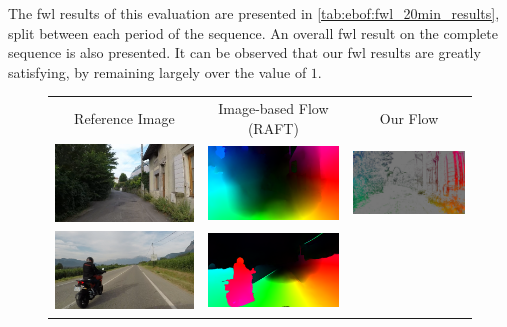 The \acrshort{fwl} results of this evaluation are presented in \cref{tab:ebof:fwl_20min_results}, split between each period of the sequence. An overall \acrshort{fwl} result on the complete sequence is also presented. It can be observed that our \acrshort{fwl} results are greatly satisfying, by remaining largely over the value of \(1\).

\begin{figure}
  \centering
  \setlength\tabcolsep{1pt}
  \begin{tabular}{@{}ccc@{}}
    Reference Image & Image-based Flow (RAFT) & Our Flow \\
    \includegraphics[width=0.325\linewidth]{mainmatter/figures/3_optical_flow/results_hd/village_reference_cropped.png} &
    \includegraphics[width=0.325\linewidth]{mainmatter/figures/3_optical_flow/results_hd/village_ground_truth_cropped.png} &
    \includegraphics[width=0.325\linewidth]{mainmatter/figures/3_optical_flow/results_hd/village_our_flow_gray.png} \\
    \includegraphics[width=0.325\linewidth]{mainmatter/figures/3_optical_flow/results_hd/motorcycle_overtaking_reference_cropped.png} &
    \includegraphics[width=0.325\linewidth]{mainmatter/figures/3_optical_flow/results_hd/motorcycle_overtaking_ground_truth_cropped.png} &

\end{tabular}
\end{figure}
